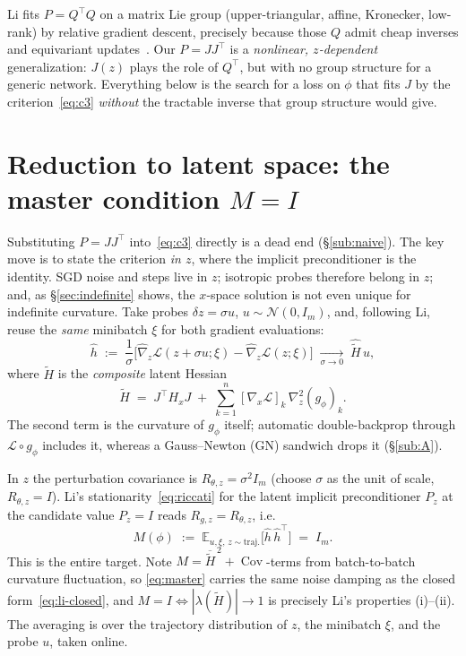 \documentclass[11pt]{article}
\theoremstyle{plain}
\theoremstyle{definition}
\theoremstyle{remark}
\DeclareMathOperator{\Cov}{Cov}
\newcommand{\E}{\mathbb{E}}
\newcommand{\N}{\mathcal{N}}
\newcommand{\Loss}{\mathcal{L}}
\newcommand{\tHess}{\tilde{H}}
\newcommand{\hh}{\hat{h}}
\begin{document}
Li fits $P=Q^{\!\top}Q$ on a matrix Lie group (upper-triangular, affine, Kronecker,
low-rank) by relative gradient descent, precisely because those $Q$ admit cheap inverses
and equivariant updates~\cite{li2015,li2018,li2022,li2024,pooladzandi2024}. Our $P=JJ^{\!\top}$
is a \emph{nonlinear, $z$-dependent} generalization: $J(z)$ plays the role of $Q^{\!\top}$,
but with no group structure for a generic network. Everything below is the search for a
loss on $\phi$ that fits $J$ by the criterion~\eqref{eq:c3} \emph{without} the tractable
inverse that group structure would give.

\section{Reduction to latent space: the master condition \texorpdfstring{$M=I$}{M=I}}
\label{sec:reduction}

Substituting $P=JJ^{\!\top}$ into~\eqref{eq:c3} directly is a dead end
(\S\ref{sub:naive}). The key move is to state the criterion \emph{in $z$}, where the
implicit preconditioner is the identity. SGD noise and steps live in $z$; isotropic probes
therefore belong in $z$; and, as \S\ref{sec:indefinite} shows, the $x$-space solution is
not even unique for indefinite curvature. Take probes $\delta z=\sigma u$,
$u\sim\N(0,I_m)$, and, following Li, reuse the \emph{same} minibatch $\xi$ for both
gradient evaluations:
\begin{equation}
\label{eq:hhat}
  \hh \;:=\; \frac1\sigma\Big[\hat\nabla_z\Loss(z+\sigma u;\xi)-\hat\nabla_z\Loss(z;\xi)\Big]
        \;\xrightarrow[\sigma\to0]{}\; \hat{\tHess}\,u ,
\end{equation}
where $\tHess$ is the \emph{composite} latent Hessian
\begin{equation}
\label{eq:composite}
  \tHess \;=\; J^{\!\top}H_x J \;+\; \sum_{k=1}^n [\nabla_x\Loss]_k\,\nabla^2_z (g_\phi)_k .
\end{equation}
The second term is the curvature of $g_\phi$ itself; automatic double-backprop through
$\Loss\circ g_\phi$ includes it, whereas a Gauss--Newton (GN) sandwich drops it (\S\ref{sub:A}).

In $z$ the perturbation covariance is $R_{\theta,z}=\sigma^2 I_m$ (choose $\sigma$ as the
unit of scale, $R_{\theta,z}=I$). Li's stationarity~\eqref{eq:riccati} for the latent
implicit preconditioner $P_z$ at the candidate value $P_z=I$ reads $R_{g,z}=R_{\theta,z}$,
i.e.
\begin{equation}
\label{eq:master}
  \boxed{\;M(\phi)\;:=\;\E_{u,\xi,\,z\sim\text{traj.}}\!\big[\hh\,\hh^{\!\top}\big]\;=\;I_m.\;}
\end{equation}
This is the entire target. Note $M=\overline{\tHess}^{\,2}+\Cov$-terms from batch-to-batch
curvature fluctuation, so \eqref{eq:master} carries the same noise damping as the closed
form~\eqref{eq:li-closed}, and $M=I\Leftrightarrow|\lambda(\tHess)|\to1$ is precisely Li's
properties (i)--(ii). The averaging is over the trajectory distribution of $z$, the
minibatch $\xi$, and the probe $u$, taken online.
\end{document}
